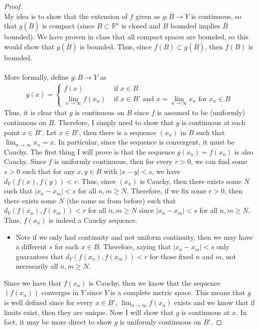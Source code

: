 \documentclass[10pt,a4paper]{article}
\theoremstyle{definition}
\theoremstyle{definition}
\numberwithin{equation}{section}
\begin{document}
\begin{proof}$ $
\\My idea is to show that the extension of $f$ given as $g: \overline{B} \to Y$ is continuous, so that $g(\overline{B})$ is compact (since $\overline{B} \subset \mathbb{R}^n$ is closed and $B$ bounded implies $\overline{B}$ bounded). We have proven in class that all compact spaces are bounded, so this would show that $g(\overline{B})$ is bounded. Thus, since $f(B) \subset g(\overline{B})$, then $f(B)$ is bounded. 
\\
\\More formally, define $g: \overline{B} \to Y$ as
\begin{align*}
g(x) = \begin{cases}
f(x) &\text{ if } x \in B\\
\lim_{n \to \infty} f(x_n) &\text{ if } x \in B' \text{ and } x = \lim_{n \to \infty} x_n \text{ for } x_n \in B
\end{cases}
\end{align*}
Thus, it is clear that $g$ is continuous on $B$ since $f$ is assumed to be (uniformly) continuous on $B$. Therefore, I simply need to show that $g$ is continuous at each point $x \in B'$. Let $x \in B'$, then there is a sequence $(x_n)$ in $B$ such that $\lim_{n \to \infty} x_n = x$. In particular, since the sequence is convergent, it must be Cauchy. The first thing I will prove is that the sequence $g(x_n) = f(x_n)$ is also Cauchy. Since $f$ is uniformly continuous, then for every $r > 0$, we can find some $s > 0$ such that for any $x, y \in B$ with $|x - y| < s$, we have $d_Y(f(x), f(y)) < r$. Thus, since $(x_n)$ is Cauchy, then there exists some $N$ such that $|x_n - x_m| < s$ for all $n, m \geq N$. Therefore, if we fix some $r > 0$, then there exists some $N$ (the same as from before) such that $d_Y(f(x_n), f(x_m)) < r$ for all $n, m \geq N$ since $|x_n - x_m| < s$ for all $n, m \geq N$.  Thus, $f(x_n)$ is indeed a Cauchy sequence. 
\begin{itemize}
\item Note if we only had continuity and not uniform continuity, then we may have a different $s$ for each $x \in B$. Therefore, saying that $|x_n - x_m| < s$ only guarantees that $d_Y(f(x_n), f(x_m)) < r$ for those fixed $n$ and $m$, not necessarily all $n, m \geq N$. 
\end{itemize}
Since we have that $f(x_n)$ is Cauchy, then we know that the sequence $(f(x_n))$ converges in $Y$ since $Y$ is a complete metric space. This means that $g$ is well defined since for every $x \in B'$, $\lim_{n \to \infty} f(x_n)$ exists and we know that if limits exist, then they are unique. Now I will show that $g$ is continuous at $x$. In fact, it may be more direct to show $g$ is uniformly continuous on $B'$.

\end{proof}
\end{document}
